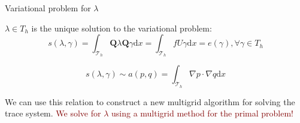 \documentclass[9pt]{beamer}
\renewcommand\vec{\mathbf}
\begin{document}
\begin{frame}[c]{Variational problem for $\lambda$}
	\begin{tcolorbox}[colback=blue!5!white,colframe=mDarkTeal,title=Characterization of $\lambda$]
		$\lambda \in T_h$ is the unique solution to the
		variational problem:
		\begin{equation*}
		s(\lambda,\gamma) =
		\int_{\mathcal{T}_h}\vec{Q}\lambda\vec{Q}\gamma\mathrm{d}x =
		\int_{\mathcal{T}_h}fU\gamma\mathrm{d}x = e(\gamma), \forall \gamma \in T_h
		\end{equation*}
	\end{tcolorbox}
	\begin{tcolorbox}[title=Relation to a primal problem
		(Gopalakrishnan 2003)]
		\begin{equation*}
			s(\lambda,\gamma) \sim a(p, q) = \int_{\mathcal{T}_h}
			\nabla p \cdot \nabla q\mathrm{d}x
		\end{equation*}
	\end{tcolorbox}
We can use this relation to construct a new multigrid algorithm
for solving the trace system. \textcolor{maroon}{We solve for $\lambda$ using a multigrid method for the primal problem!}
\end{frame}
\end{document}
